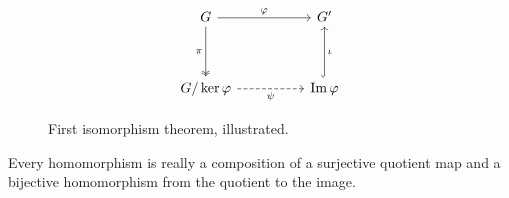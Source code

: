 \begin{center}
\[\begin{tikzcd}
	G && {G'} \\
	\\
	{G/\ker \varphi} && {\operatorname{Im}\varphi}
	\arrow["\varphi", from=1-1, to=1-3]
	\arrow["\pi"', two heads, from=1-1, to=3-1]
	\arrow["{\psi}"', dashed, from=3-1, to=3-3]
	\arrow["\iota"', hook, from=3-3, to=1-3]
\end{tikzcd}\]
\end{center}

\begin{figure}[htpb]
    \centering
    \caption{First isomorphism theorem, illustrated.} 
    \label{fig:isomorphism-theorem}
\end{figure}
\begin{remark}
    Every homomorphism is really a composition of a surjective quotient map and a bijective homomorphism from the quotient to the image.
\end{remark}